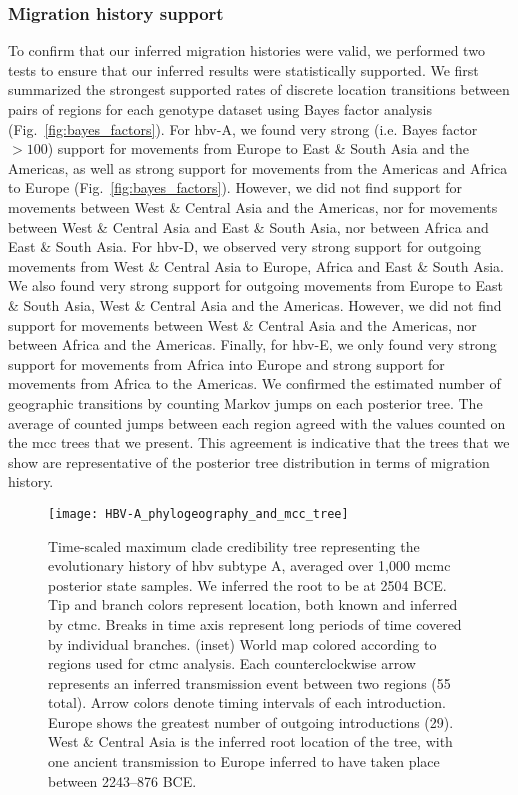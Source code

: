 \subsubsection{Migration history support}

To confirm that our inferred migration histories were valid, we performed two tests to ensure that our inferred results were statistically supported.
We first summarized the strongest supported rates of discrete location transitions between pairs of regions for each genotype dataset using Bayes factor analysis (Fig.~\ref{fig:bayes_factors}).
For \gls{hbv}-A, we found very strong (i.e. Bayes factor $>100$) support for movements from Europe to East \& South Asia and the Americas, as well as strong support for movements from the Americas and Africa to Europe (Fig.~\ref{fig:bayes_factors}).
However, we did not find support for movements between West \& Central Asia and the Americas, nor for movements between West \& Central Asia and East \& South Asia, nor between Africa and East \& South Asia.
For \gls{hbv}-D, we observed very strong support for outgoing movements from West \& Central Asia to Europe, Africa and East \& South Asia.
We also found very strong support for outgoing movements from Europe to East \& South Asia, West \& Central Asia and the Americas.
However, we did not find support for movements between West \& Central Asia and the Americas, nor between Africa and the Americas.
Finally, for \gls{hbv}-E, we only found very strong support for movements from Africa into Europe and strong support for movements from Africa to the Americas.
We confirmed the estimated number of geographic transitions by counting Markov jumps on each posterior tree.
The average of counted jumps between each region agreed with the values counted on the \gls{mcc} trees that we present.
This agreement is indicative that the trees that we show are representative of the posterior tree distribution in terms of migration history.

\begin{figure}[ht]
  \centering
  \medskip
  \texttt{[image: HBV-A\_phylogeography\_and\_mcc\_tree]}
  \caption[HBV-A phylogeography ]{Time-scaled maximum clade credibility tree representing the evolutionary history of \gls{hbv} subtype A, averaged over 1,000 \gls{mcmc} posterior state samples. We inferred the root to be at 2504 BCE. Tip and branch colors represent location, both known and inferred by \gls{ctmc}. Breaks in time axis represent long periods of time covered by individual branches. (inset) World map colored according to regions used for \gls{ctmc} analysis. Each counterclockwise arrow represents an inferred transmission event between two regions (55 total). Arrow colors denote timing intervals of each introduction. Europe shows the greatest number of outgoing introductions (29). West \& Central Asia is the inferred root location of the tree, with one ancient transmission to Europe inferred to have taken place between 2243--876 BCE.}
  \label{fig:HBV-A_phylogeo}
\end{figure}


